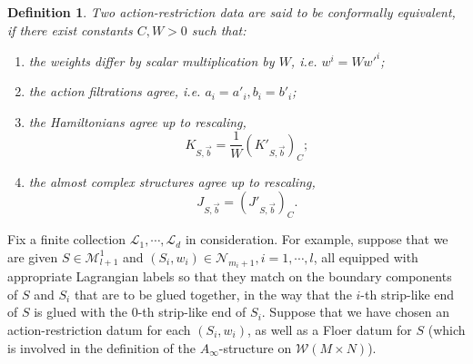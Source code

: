 \documentclass{amsart}
\newtheorem{definition}[theorem]{Definition}
\numberwithin{equation}{section}
\numberwithin{figure}{section}
\begin{document}
\begin{definition}
	Two action-restriction data are said to be conformally equivalent, if there exist constants $C, W > 0$ such that:
\begin{enumerate}[label=(\roman*)]

\item the weights differ by scalar multiplication by $W$, i.e. $w^{i} = W w'^{i}$;

\item the action filtrations agree, i.e. $a_{i} = a'_{i}, b_{i} = b'_{i}$;

\item the Hamiltonians agree up to rescaling,
\begin{equation}
K_{S, \vec{b}} = \frac{1}{W}(K'_{S, \vec{b}})_{C};
\end{equation}

\item the almost complex structures agree up to rescaling,
\begin{equation}
J_{S, \vec{b}} = (J'_{S, \vec{b}})_{C}.
\end{equation}

\end{enumerate}
\end{definition}
	
	Fix a finite collection $\mathcal{L}_{1}, \cdots, \mathcal{L}_{d}$ in consideration. For example, suppose that we are given $S \in \mathcal{M}_{l+1}^{1}$ and $(S_{i}, w_{i}) \in \mathcal{N}_{m_{i}+1}, i = 1, \cdots, l$, all equipped with appropriate Lagrangian labels so that they match on the boundary components of $S$ and $S_{i}$ that are to be glued together, in the way that the $i$-th strip-like end of $S$ is glued with the $0$-th strip-like end of $S_{i}$. Suppose that we have chosen an action-restriction datum for each $(S_{i}, w_{i})$, as well as a Floer datum for $S$ (which is involved in the definition of the $A_{\infty}$-structure on $\mathcal{W}(M \times N)$). \par
\end{document}
